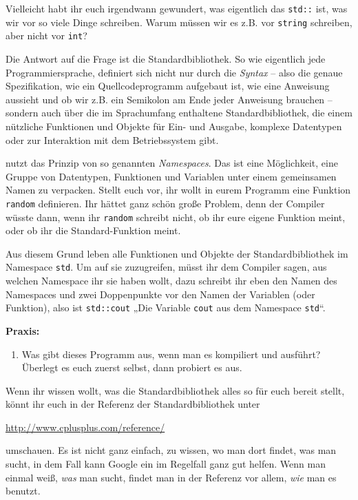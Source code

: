 
Vielleicht habt ihr euch irgendwann gewundert, was eigentlich das
\texttt{std::} ist, was wir vor so viele Dinge schreiben. Warum müssen wir es
z.B. vor \texttt{string} schreiben, aber nicht vor \texttt{int}?

Die Antwort auf die Frage ist die \Cpp Standardbibliothek. So wie eigentlich
jede Programmiersprache, definiert sich \Cpp nicht nur durch die \emph{Syntax}
-- also die genaue Spezifikation, wie ein Quellcodeprogramm aufgebaut ist, wie
eine Anweisung aussieht und ob wir z.B. ein Semikolon am Ende jeder Anweisung
brauchen -- sondern auch über die im Sprachumfang enthaltene
Standardbibliothek, die einem nützliche Funktionen und Objekte für Ein- und
Ausgabe, komplexe Datentypen oder zur Interaktion mit dem Betriebssystem gibt.

\Cpp nutzt das Prinzip von so genannten \emph{Namespaces}. Das ist eine
Möglichkeit, eine Gruppe von Datentypen, Funktionen und Variablen unter einem
gemeinsamen Namen zu verpacken. Stellt euch vor, ihr wollt in eurem Programm
eine Funktion \texttt{random} definieren. Ihr hättet ganz schön große Problem,
denn der Compiler wüsste dann, wenn ihr \texttt{random} schreibt nicht, ob ihr
eure eigene Funktion meint, oder ob ihr die Standard-\Cpp Funktion meint.

Aus diesem Grund leben alle Funktionen und Objekte der \Cpp Standardbibliothek
im Namespace \texttt{std}. Um auf sie zuzugreifen, müsst ihr dem Compiler
sagen, aus welchen Namespace ihr sie haben wollt, dazu schreibt ihr eben den
Namen des Namespaces und zwei Doppenpunkte vor den Namen der Variablen (oder
Funktion), also ist \texttt{std::cout} „Die Variable \texttt{cout} aus dem
Namespace \texttt{std}“.


\textbf{Praxis:}
\begin{enumerate}
    \item Was gibt dieses Programm aus, wenn man es kompiliert und ausführt?
        Überlegt es euch zuerst selbst, dann probiert es aus.
\end{enumerate}

Wenn ihr wissen wollt, was die Standardbibliothek alles so für euch bereit
stellt, könnt ihr euch in der Referenz der Standardbibliothek unter

\url{http://www.cplusplus.com/reference/}

umschauen. Es ist nicht ganz einfach, zu wissen, wo man dort findet, was man
sucht, in dem Fall kann Google ein im Regelfall ganz gut helfen. Wenn man
einmal weiß, \emph{was} man sucht, findet man in der Referenz vor allem,
\emph{wie} man es benutzt.

